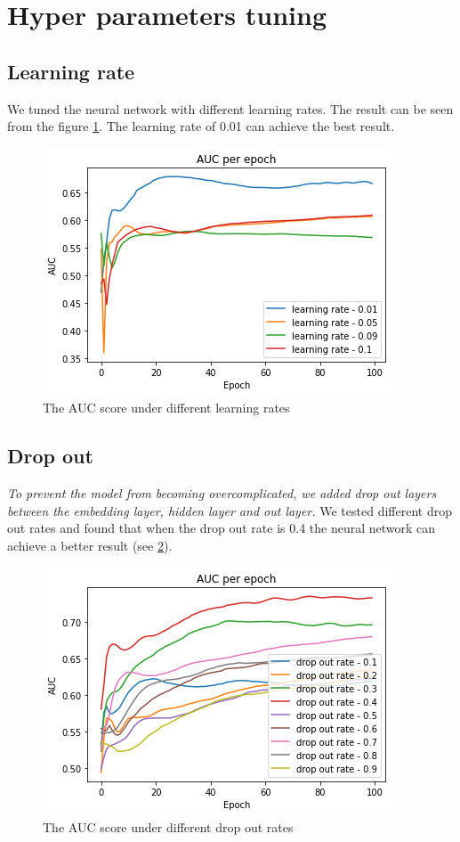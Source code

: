 \documentclass[11pt,twoside]{report}
\begin{document}
\section{Hyper parameters tuning}
\subsection{Learning rate}
We tuned the neural network with different learning rates. The result can be seen from the figure \ref{fig:auc_learning_rate}. The learning rate of 0.01 can achieve the best result.

\begin{figure}[H]
    \centering
    \includegraphics[scale=0.9]{auc_learning_rate.png}
    \caption{The AUC score under different learning rates}
    \label{fig:auc_learning_rate}
\end{figure}

\subsection{Drop out}
\textit{To prevent the model from becoming overcomplicated, we added drop out layers between the embedding layer, hidden layer and out layer.} We tested different drop out rates and found that when the drop out rate is 0.4 the neural network can achieve a better result (see \ref{fig:auc_drop_out_rate}).

\begin{figure}[H]
    \centering
    \includegraphics[scale=0.9]{auc_drop_out_rate.png}
    \caption{The AUC score under different drop out rates}
    \label{fig:auc_drop_out_rate}
\end{figure}
\end{document}
